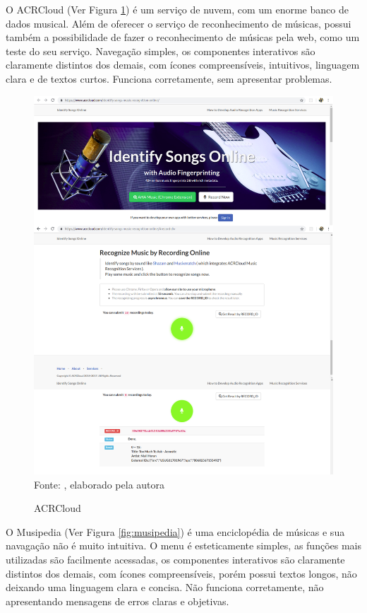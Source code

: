 O ACRCloud (Ver Figura \ref{fig:acrcloud}) é um serviço de nuvem, com um enorme banco de dados musical. Além de oferecer o serviço de reconhecimento de músicas, possui também a possibilidade de fazer o reconhecimento de músicas pela web, como um teste do seu serviço. Navegação simples, os componentes interativos são claramente distintos dos demais, com ícones compreensíveis, intuitivos, linguagem clara e de textos curtos. Funciona corretamente, sem apresentar problemas.

\begin{figure}[!htb]
   \centering
   \caption{ACRCloud}\label{fig:acrcloud} 
   \includegraphics[scale=0.30]{figuras/acrcloud.png}
   \\Fonte: \cite{acrcloudSite}, elaborado pela autora
\end{figure}

O Musipedia (Ver Figura \ref{fig:musipedia}) é uma enciclopédia de músicas e sua navagação não é muito intuitiva. O menu é esteticamente simples, as funções mais utilizadas são facilmente acessadas, os componentes interativos são claramente distintos dos demais, com ícones compreensíveis, porém possui textos longos, não deixando uma linguagem clara e concisa. Não funciona corretamente, não apresentando mensagens de erros claras e objetivas.

